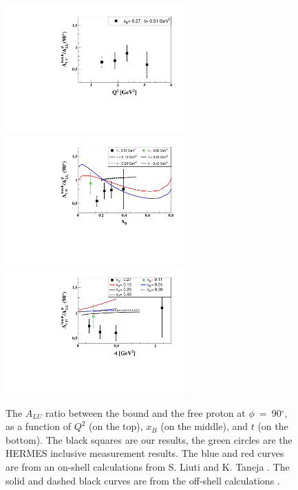 \documentclass[twocolumn,nofootinbib,showpacs,prl,superscriptaddress,secnumarabic,amssymb,nobibnotes,aps,floatfix]{revtex4}
\begin{document}
\begin{figure}[tp]
\centering
\includegraphics[width=6.9cm]{figs/ALU_ratioInc_Q2_shortscenrario.pdf}\\
\includegraphics[width=6.9cm]{figs/ALU_ratioInc_x_shortscenrario.pdf}\\
\includegraphics[width=6.9cm]{figs/ALU_ratioInc_t_shortscenrario.pdf}
\caption{ The $A_{LU}$ ratio between the bound and the free proton at 
   $\phi$~=~90$^{\circ}$, as a function of $Q^2$ (on the top), $x_B$ (on the 
   middle), and $t$ (on the bottom). The black squares are our results, the 
   green circles are the HERMES inclusive measurement \cite{Airapetian} 
   results.  The blue and red curves are from an on-shell calculations from S.  
   Liuti and K.  Taneja \cite{simonetta_2}. The solid and dashed black curves 
are from the off-shell calculations \cite{Guzey:2008fe}.} 
\label{fig:incoh_EMC_ratio_ALU_proton}
\end{figure}



\end{document}
